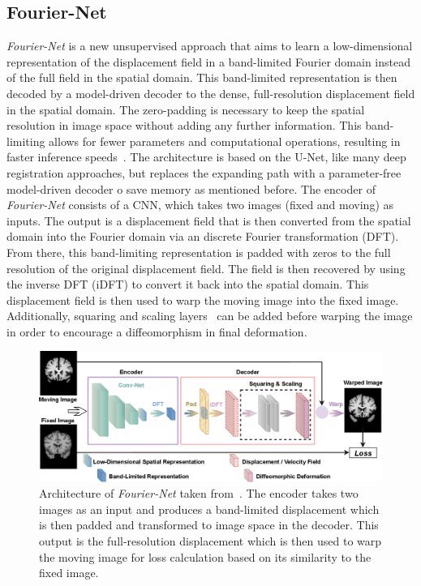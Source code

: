 \subsection{Fourier-Net}	\label{SubSec:Fourier-Net}
\emph{Fourier-Net} is a new unsupervised approach that aims to learn a low-dimensional representation of the displacement field in a band-limited Fourier domain instead of the full field in the spatial domain. This band-limited representation is then decoded by a model-driven decoder to the dense, full-resolution displacement field in the spatial domain. The zero-padding is necessary to keep the spatial resolution in image space without adding any further information. This band-limiting allows for fewer parameters and computational operations, resulting in faster inference speeds~\cite{Fourier-Net}. The architecture is based on the U-Net, like many deep registration approaches, but replaces the expanding path with a parameter-free model-driven decoder o save memory as mentioned before. The encoder of \emph{Fourier-Net} consists of a CNN, which takes two images (fixed and moving) as inputs. The output is a displacement field that is then converted from the spatial domain into the Fourier domain via an discrete Fourier transformation (DFT). From there, this band-limiting representation 
is padded with zeros to the full resolution of the original displacement field. The field is then recovered by using the inverse DFT (iDFT) to convert it back into the spatial domain. This displacement field is then used to warp the moving image into the fixed image. Additionally, squaring and scaling layers~\cite{Dalca2018} can be added before warping the image in order to encourage a diffeomorphism in final deformation. 

\begin{figure}[h] %
	\centering
	\graphicspath{{images/}{\main/images/}}
	\includegraphics[width=\linewidth]{ArchitectureFourier-Net.png} 
	\caption{Architecture of \emph{Fourier-Net} taken from~\cite{Fourier-Net}. The encoder takes two images as an input and produces a band-limited displacement which is then padded and transformed to image space in the decoder. This output is the full-resolution displacement which is then used to warp the moving image for loss calculation based on its similarity to the fixed image.}
	\label{fig:Fourier-Net}
\end{figure}

